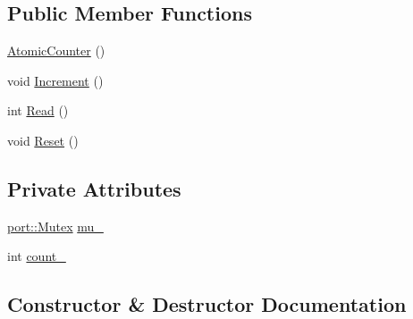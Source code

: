 \subsection*{Public Member Functions}
\begin{DoxyCompactItemize}
\item 
\hyperlink{classleveldb_1_1anonymous__namespace_02emltest_8cc_03_1_1_atomic_counter_ae3459e69c29a20727edb63e71afe18fe}{Atomic\+Counter} ()
\item 
void \hyperlink{classleveldb_1_1anonymous__namespace_02emltest_8cc_03_1_1_atomic_counter_a86bf9afac87eafa1e905d24e0a9894db}{Increment} ()
\item 
int \hyperlink{classleveldb_1_1anonymous__namespace_02emltest_8cc_03_1_1_atomic_counter_a0af57c89beb672179497790120a83db7}{Read} ()
\item 
void \hyperlink{classleveldb_1_1anonymous__namespace_02emltest_8cc_03_1_1_atomic_counter_ab56b7394314aa06fed9182053b23a236}{Reset} ()
\end{DoxyCompactItemize}
\subsection*{Private Attributes}
\begin{DoxyCompactItemize}
\item 
\hyperlink{classleveldb_1_1port_1_1_mutex}{port\+::\+Mutex} \hyperlink{classleveldb_1_1anonymous__namespace_02emltest_8cc_03_1_1_atomic_counter_a7bc85730a55754e91c94bb0835d91167}{mu\+\_\+}
\item 
int \hyperlink{classleveldb_1_1anonymous__namespace_02emltest_8cc_03_1_1_atomic_counter_ab49b121f2e825cd0896e9133a168e5f3}{count\+\_\+}
\end{DoxyCompactItemize}


\subsection{Constructor \& Destructor Documentation}
\hypertarget{classleveldb_1_1anonymous__namespace_02emltest_8cc_03_1_1_atomic_counter_ae3459e69c29a20727edb63e71afe18fe}{}
